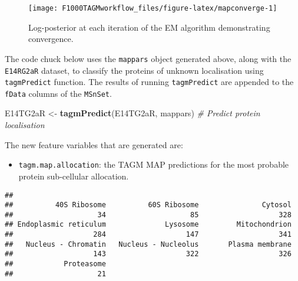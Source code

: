 \documentclass[9pt,a4paper,]{extarticle}
\newenvironment{Shaded}{\begin{snugshade}}{\end{snugshade}}
\newcommand{\CommentTok}[1]{\textcolor[rgb]{0.56,0.35,0.01}{\textit{#1}}}
\newcommand{\KeywordTok}[1]{\textcolor[rgb]{0.13,0.29,0.53}{\textbf{#1}}}
\newcommand{\NormalTok}[1]{#1}
\newcommand{\OperatorTok}[1]{\textcolor[rgb]{0.81,0.36,0.00}{\textbf{#1}}}
\newcommand{\StringTok}[1]{\textcolor[rgb]{0.31,0.60,0.02}{#1}}
\begin{document}
\begin{figure}

{\centering \texttt{[image: F1000TAGMworkflow\_files/figure-latex/mapconverge-1]} 

}

\caption{Log-posterior at each iteration of the EM algorithm demonstrating convergence.}\label{fig:mapconverge}
\end{figure}

The code chuck below uses the \texttt{mappars} object generated above, along
with the \texttt{E14RG2aR} dataset, to classify the proteins of unknown localisation
using \texttt{tagmPredict} function. The results of running \texttt{tagmPredict} are
appended to the \texttt{fData} columns of the \texttt{MSnSet}.

\begin{Shaded}
\begin{Highlighting}[]
\NormalTok{E14TG2aR <-}\StringTok{ }\KeywordTok{tagmPredict}\NormalTok{(E14TG2aR, mappars) }\CommentTok{# Predict protein localisation}
\end{Highlighting}
\end{Shaded}

The new feature variables that are generated are:

\begin{itemize}
\item
  \texttt{tagm.map.allocation}: the TAGM MAP predictions for the most
  probable protein sub-cellular allocation.
\end{itemize}

\begin{Shaded}
\end{Shaded}

\begin{verbatim}
## 
##          40S Ribosome          60S Ribosome               Cytosol 
##                    34                    85                   328 
## Endoplasmic reticulum              Lysosome         Mitochondrion 
##                   284                   147                   341 
##   Nucleus - Chromatin   Nucleus - Nucleolus       Plasma membrane 
##                   143                   322                   326 
##            Proteasome 
##                    21
\end{verbatim}
\end{document}
